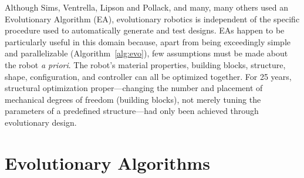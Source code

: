 Although Sims, Ventrella, Lipson and Pollack, and many, many others \cite{ventrella1998designing,lichtensteiger1999evolving,ray2001aesthetically,bongard2003evolving,hornby2002creating,komosinski2001comparison,komosinski2003framsticks,hotz2004asymmetric,vaughan2004evolution,shim2006evolving,bongard2006resilient,chaumont2007evolving,bongard2010utility,auerbach2010evolving,auerbach2010dynamic,lehman2011evolving,hiller2012automatic,cheney2013unshackling,cheney2014electro,lessin2013open,auerbach2014environmental,cheney2015tight,brodbeck2015morphological,lessin2015soft,cellucci20171d,cheney2018scalable,rosser2019sim2real} used an Evolutionary Algorithm (EA),
evolutionary robotics is independent of the specific procedure used to automatically generate and test designs.
EAs happen to be particularly useful in this domain because, apart from being exceedingly simple and parallelizable (Algorithm~\ref{alg:evo}),
few assumptions must be made about the robot \textit{a priori}.
The robot's material properties, building blocks, structure, shape, configuration, and controller can all be optimized together.
For 25 years, structural optimization proper---changing the number and placement of mechanical degrees of freedom (building blocks), not merely tuning the parameters of a predefined structure---had only been achieved through evolutionary design.



\section{Evolutionary Algorithms}

